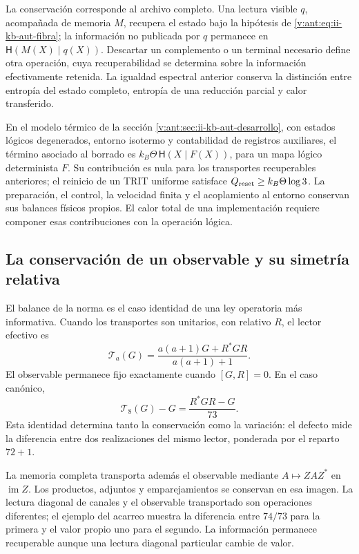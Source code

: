 La conservación corresponde al archivo completo. Una lectura visible
\(q\), acompañada de memoria \(M\), recupera el estado bajo la
hipótesis de \eqref{v:ant:eq:ii-kb-aut-fibra}; la información no
publicada por \(q\) permanece en
\(\mathsf H(M(X)\mid q(X))\). Descartar un complemento o un
terminal necesario define otra operación, cuya recuperabilidad se
determina sobre la información efectivamente retenida. La igualdad
espectral anterior conserva la distinción entre entropía del estado
completo, entropía de una reducción parcial y calor transferido.

En el modelo térmico de la sección
\ref{v:ant:sec:ii-kb-aut-desarrollo}, con estados lógicos degenerados,
entorno isotermo y contabilidad de registros auxiliares, el término
asociado al borrado es
\(k_B\Theta\,\mathsf H(X\mid F(X))\), para un mapa lógico
determinista \(F\). Su contribución es nula para los transportes
recuperables anteriores; el reinicio de un TRIT uniforme satisface
\(Q_{\rm reset}\geq k_B\Theta\log3\). La preparación, el control,
la velocidad finita y el acoplamiento al entorno conservan sus
balances físicos propios. El calor total de una implementación
requiere componer esas contribuciones con la operación lógica.

\subsection{La conservación de un observable y su simetría relativa}
\label{lib06:simetria}

El balance de la norma es el caso identidad de una ley operatoria
más informativa. Cuando los transportes son unitarios, con relativo
\(R\), el lector efectivo es
\begin{equation}
 \mathcal T_a(G)=\frac{a(a+1)G+R^*GR}{a(a+1)+1}.
 \label{lib06:lector}
\end{equation}
El observable permanece fijo exactamente cuando \([G,R]=0\).
En el caso canónico,
\begin{equation}
 \mathcal T_8(G)-G=\frac{R^*GR-G}{73}.
 \label{lib06:defecto-lector}
\end{equation}
Esta identidad determina tanto la conservación como la variación:
el defecto mide la diferencia entre dos realizaciones del mismo
lector, ponderada por el reparto \(72+1\).

La memoria completa transporta además el observable mediante
\(A\mapsto ZAZ^*\) en \(\operatorname{im}Z\). Los productos,
adjuntos y emparejamientos se conservan en esa imagen. La lectura
diagonal de canales y el observable transportado son operaciones
diferentes; el ejemplo del acarreo muestra la diferencia entre
\(74/73\) para la primera y el valor propio uno para el segundo.
La información permanece recuperable aunque una lectura diagonal
particular cambie de valor.

